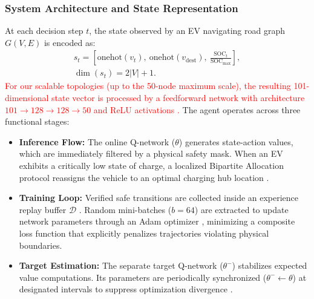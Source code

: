 \documentclass[conference]{IEEEtran}
\begin{document}
\subsubsection{System Architecture and State Representation}
At each decision step $t$, the state observed by an EV navigating road graph $G(V,E)$ is encoded as:
\begin{equation}
\begin{aligned}
s_t = \left[\text{onehot}(v_t),\ \text{onehot}(v_{\text{dest}}),\ \frac{\text{SOC}_t}{\text{SOC}_{\max}}\right], \\
\dim(s_t) = 2|V| + 1.
\end{aligned}
\end{equation}
\textcolor{red}{For our scalable topologies (up to the 50-node maximum scale), the resulting 101-dimensional state vector is processed by a feedforward network with architecture $101 \rightarrow 128 \rightarrow 128 \rightarrow 50$ and ReLU activations \cite{goodfellow2016deep}.} The agent operates across three functional stages:
\begin{itemize}
    \item \textbf{Inference Flow:} The online Q-network ($\theta$) generates state-action values, which are immediately filtered by a physical safety mask. When an EV exhibits a critically low state of charge, a localized Bipartite Allocation protocol reassigns the vehicle to an optimal charging hub location \cite{kuhn1955hungarian}.
    \item \textbf{Training Loop:} Verified safe transitions are collected inside an experience replay buffer $\mathcal{D}$ \cite{lin1992self}. Random mini-batches ($b=64$) are extracted to update network parameters through an Adam optimizer \cite{kingma2014adam}, minimizing a composite loss function that explicitly penalizes trajectories violating physical boundaries.
    \item \textbf{Target Estimation:} The separate target Q-network ($\theta^-$) stabilizes expected value computations. Its parameters are periodically synchronized ($\theta^- \leftarrow \theta$) at designated intervals to suppress optimization divergence \cite{van2016deep}.
\end{itemize}
\end{document}
